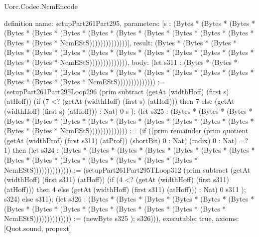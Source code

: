 \begin{lexlean}{Uorc.Codec.NcmEncode}
\begin{semanticmodule}
definition{
  name: setupPart261Part295,
  parameters: [s : (Bytes * (Bytes * (Bytes * (Bytes * (Bytes * (Bytes * (Bytes * (Bytes * (Bytes * (Bytes * (Bytes * (Bytes * (Bytes * (Bytes * NcmEStS))))))))))))))],
  result: (Bytes * (Bytes * (Bytes * (Bytes * (Bytes * (Bytes * (Bytes * (Bytes * (Bytes * (Bytes * (Bytes * (Bytes * (Bytes * (Bytes * NcmEStS)))))))))))))),
  body: (let s311 : (Bytes * (Bytes * (Bytes * (Bytes * (Bytes * (Bytes * (Bytes * (Bytes * (Bytes * (Bytes * (Bytes * (Bytes * (Bytes * (Bytes * NcmEStS)))))))))))))) := (setupPart261Part295Loop296 (prim subtract (getAt (widthHoff) (first s) (atHoff)) (if (7 <? (getAt (widthHoff) (first s) (atHoff))) then 7 else (getAt (widthHoff) (first s) (atHoff))) : Nat) 0 s ); (let s325 : (Bytes * (Bytes * (Bytes * (Bytes * (Bytes * (Bytes * (Bytes * (Bytes * (Bytes * (Bytes * (Bytes * (Bytes * (Bytes * (Bytes * NcmEStS)))))))))))))) := (if ((prim remainder (prim quotient (getAt (widthProf) (first s311) (atProf)) (shortBit) 0 : Nat) (radix) 0 : Nat) =? 1) then (let s324 : (Bytes * (Bytes * (Bytes * (Bytes * (Bytes * (Bytes * (Bytes * (Bytes * (Bytes * (Bytes * (Bytes * (Bytes * (Bytes * (Bytes * NcmEStS)))))))))))))) := (setupPart261Part295TLoop312 (prim subtract (getAt (widthHoff) (first s311) (atHoff)) (if (4 <? (getAt (widthHoff) (first s311) (atHoff))) then 4 else (getAt (widthHoff) (first s311) (atHoff))) : Nat) 0 s311 ); s324) else s311); (let s326 : (Bytes * (Bytes * (Bytes * (Bytes * (Bytes * (Bytes * (Bytes * (Bytes * (Bytes * (Bytes * (Bytes * (Bytes * (Bytes * (Bytes * NcmEStS)))))))))))))) := (newByte s325 ); s326))),
  executable: true,
  axioms: [Quot.sound, propext]
}


\end{semanticmodule}
\end{lexlean}
